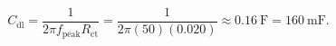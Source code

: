 \documentclass[preview]{standalone}
\begin{document}
\[C_\text{dl} = \frac{1}{2\pi f_\text{peak} R_\text{ct}} = \frac{1}{2\pi(50)(0.020)} \approx 0.16\ \text{F} = 160\ \text{mF}.\]
\end{document}
